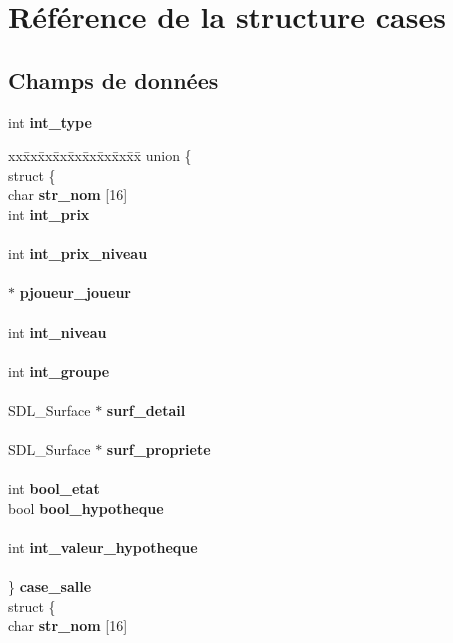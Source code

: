 \section{R\'{e}f\'{e}rence de la structure cases}
\label{structcases}
\subsection*{Champs de donn\'{e}es}
\begin{CompactItemize}
\item 
int {\bf int\_\-type}
\item 
\begin{tabbing}
xx\=xx\=xx\=xx\=xx\=xx\=xx\=xx\=xx\=\kill
union \{\\
\>struct \{\\
\>\>char {\bf str\_nom} [16]\\
\>\>int {\bf int\_prix}\\
\>\>\>\>\>\\\>\>int {\bf int\_prix\_niveau}\\
\>\>\\\> $\ast$ {\bf pjoueur\_joueur}\\
\>\>\\\>\>int {\bf int\_niveau}\\
\>\>\\\>\>int {\bf int\_groupe}\\
\>\>\\\>\>SDL\_Surface $\ast$ {\bf surf\_detail}\\
\>\>\\\>\>SDL\_Surface $\ast$ {\bf surf\_propriete}\\
\>\>\\\>\>int {\bf bool\_etat}\\
\>\>bool {\bf bool\_hypotheque}\\
\>\>\>\>\\\>\>int {\bf int\_valeur\_hypotheque}\\
\>\>\\\>\} {\bf case\_salle}\\
\>struct \{\\
\>\>char {\bf str\_nom} [16]\\

\end{tabbing}
\end{CompactItemize}
